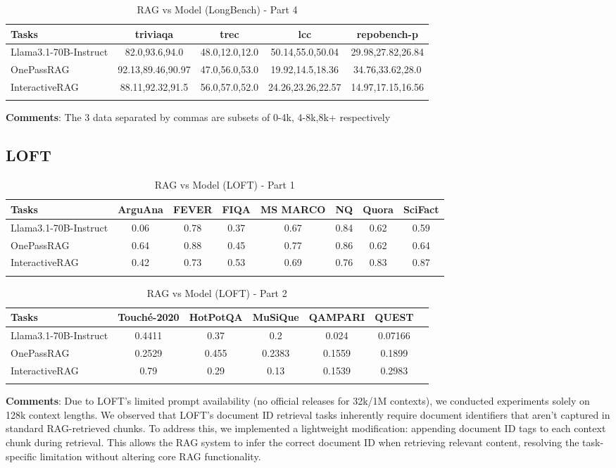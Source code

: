 \begin{longtable}{l|c c c c}
\hline
\textbf{Tasks} & \textbf{triviaqa} & \textbf{trec} & \textbf{lcc} & \textbf{repobench-p} \\
\hline \endhead
Llama3.1-70B-Instruct & 82.0,93.6,94.0 & 48.0,12.0,12.0 & 50.14,55.0,50.04 & 29.98,27.82,26.84 \\
OnePassRAG  & 92.13,89.46,90.97 & 47.0,56.0,53.0 & 19.92,14.5,18.36 & 34.76,33.62,28.0 \\
InteractiveRAG  & 88.11,92.32,91.5 & 56.0,57.0,52.0 & 24.26,23.26,22.57 & 14.97,17.15,16.56 \\
\hline
\caption{RAG vs Model (LongBench) - Part 4}
\label{tab:longbench_part4}
\end{longtable}
\textbf{Comments}: The 3 data separated by commas are subsets of 0-4k, 4-8k,8k+ respectively


\subsection{LOFT}
\begin{longtable}{l|c c c c c c c}
\hline
\textbf{Tasks} & \textbf{ArguAna} & \textbf{FEVER} & \textbf{FIQA} & \textbf{MS MARCO} & \textbf{NQ} & \textbf{Quora} & \textbf{SciFact} \\
\hline \endhead 
Llama3.1-70B-Instruct & 0.06 & 0.78 & 0.37 & 0.67 & 0.84 & 0.62 & 0.59 \\
OnePassRAG  & 0.64 & 0.88 & 0.45 & 0.77 & 0.86 & 0.62 & 0.64 \\
InteractiveRAG  & 0.42 & 0.73 & 0.53 & 0.69 & 0.76 & 0.83 & 0.87 \\
\hline
\caption{RAG vs Model (LOFT) - Part 1}
\end{longtable}

\begin{longtable}{l|c c c c c c}
\hline
\textbf{Tasks} & \textbf{Touché-2020} & \textbf{HotPotQA} & \textbf{MuSiQue} & \textbf{QAMPARI} & \textbf{QUEST}  \\
\hline \endhead
Llama3.1-70B-Instruct & 0.4411 & 0.37 & 0.2 & 0.024 & 0.07166 \\
OnePassRAG  & 0.2529 & 0.455 & 0.2383 & 0.1559 & 0.1899  \\
InteractiveRAG  & 0.79 & 0.29 & 0.13 & 0.1539 & 0.2983 \\
\hline
\caption{RAG vs Model (LOFT) - Part 2}
\label{tab:your_label}
\end{longtable}
\textbf{Comments}: Due to LOFT's limited prompt availability (no official releases for 32k/1M contexts), we conducted experiments solely on 128k context lengths. We observed that LOFT’s document ID retrieval tasks inherently require document identifiers that aren’t captured in standard RAG-retrieved chunks. To address this, we implemented a lightweight modification: appending document ID tags to each context chunk during retrieval. This allows the RAG system to infer the correct document ID when retrieving relevant content, resolving the task-specific limitation without altering core RAG functionality. 
\newpage

